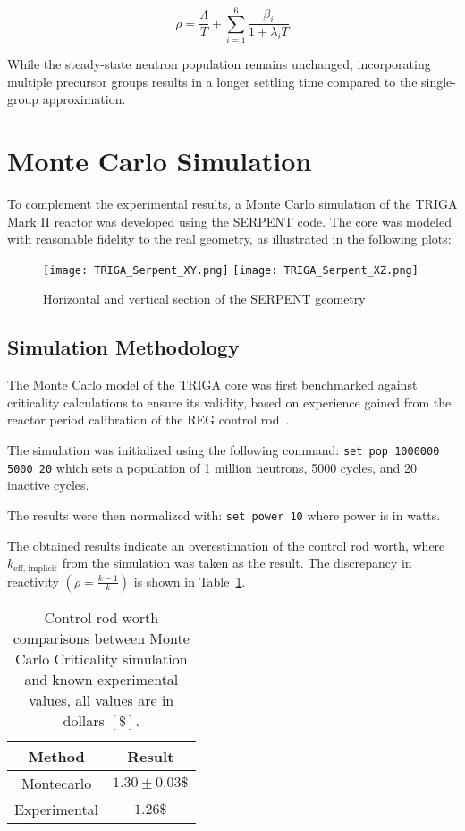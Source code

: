 \begin{equation}
    \rho = \frac{\Lambda}{T} + \sum_{i=1}^{6} \frac{\beta_i}{1 + \lambda_i T}
\end{equation}

While the steady-state neutron population remains unchanged, incorporating multiple precursor groups results in a longer settling time compared to the single-group approximation.
\section{Monte Carlo Simulation}

To complement the experimental results, a Monte Carlo simulation of the TRIGA Mark II reactor was developed using the SERPENT code. The core was modeled with reasonable fidelity to the real geometry, as illustrated in the following plots:

\begin{figure}[H]
    \centering
    \texttt{[image: TRIGA\_Serpent\_XY.png]}
    \texttt{[image: TRIGA\_Serpent\_XZ.png]}
    \caption{Horizontal and vertical section of the SERPENT geometry}
    \label{fig:triga_geometry}
\end{figure}

\subsection{Simulation Methodology}

The Monte Carlo model of the TRIGA core was first benchmarked against criticality calculations to ensure its validity, based on experience gained from the reactor period calibration of the REG control rod~\cite{Lorenzi2024}.

The simulation was initialized using the following command: \texttt{set pop 1000000 5000 20} which sets a population of 1 million neutrons, 5000 cycles, and 20 inactive cycles. 

The results were then normalized with: \texttt{set power 10} where power is in watts.

The obtained results indicate an overestimation of the control rod worth, where $k_{\text{eff, implicit}} $ from the simulation was taken as the result. The discrepancy in reactivity $\left( \rho = \frac{k-1}{k} \right)$ is shown in Table~\ref{tab:montecarlo_results}.

\begin{table}[h]
    \centering
    \begin{tabular}{|c|c|}
        \hline
        \textbf{Method} & \textbf{Result} \\
        \hline
        Montecarlo & $1.30 \pm 0.03\$$ \\
        Experimental & $1.26\$$ \\
        \hline
    \end{tabular}
    \caption{Control rod worth comparisons between Monte Carlo Criticality simulation and known experimental values, all values are in dollars $\left[ \$ \right]$.}
    \label{tab:montecarlo_results}
\end{table}

